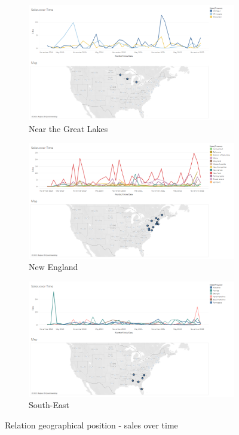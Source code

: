 \documentclass[openany]{article}
\begin{document}
\begin{figure}[h]\ContinuedFloat
	\centering
	\begin{subfigure}{.8\textwidth}
		\centering
		\includegraphics[width=\linewidth]{Tableau/b_3}
		\caption{Near the Great Lakes}
	\end{subfigure}

	\begin{subfigure}{.8\textwidth}
		\centering
		\includegraphics[width=\linewidth]{Tableau/b_4}
		\caption{New England}
		\label {new_england}
	\end{subfigure}

	\begin{subfigure}{.8\textwidth}
		\centering
		\includegraphics[width=\linewidth]{Tableau/b_5}
		\caption{South-East}
	\end{subfigure}
	\caption{Relation geographical position - sales over time}
\end{figure}
\end{document}
